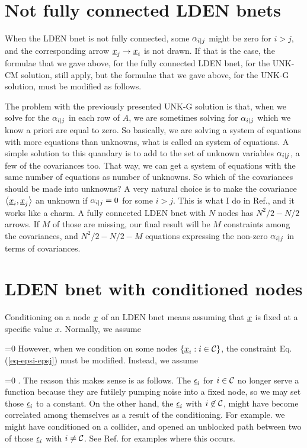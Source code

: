\section{Not fully connected LDEN bnets}

When the LDEN bnet is not
fully connected, some $\alpha_{i|j}$
might be zero for $i>j$, and the
corresponding arrow $\rvx_j\rarrow\rvx_i$
is not drawn. If that is the case,
the formulae that we gave above,
for the fully connected LDEN bnet,
for the UNK-CM solution, still apply,
but the formulae that we gave above, for the UNK-G solution,
must be modified as follows.

The problem with the previously
presented UNK-G solution is that,
when we solve for the $\alpha_{i|j}$
in each row of $A$,
we are sometimes solving for $\alpha_{i|j}$
which we know a priori are equal to zero.
So basically, we are solving a system of equations with more equations than unknowns,
what is called an  system
of equations. A simple solution
to this quandary is to add to the set
of unknown variables $\alpha_{i|j}$,
a few of the covariances too.
That way, we can get a system
of equations with the same number of
equations as number of unknowns.
So which of the covariances
should be made into unknowns?
A very natural choice
is to make the covariance $\av{\rvx_i, \rvx_j}$
an unknown if $\alpha_{i|j}=0$
for some $i>j$.
This is what I do in Ref.\cite{scumpy},
and it works like a charm.
A fully connected LDEN bnet with $N$ nodes
has $N^2/2-N/2$ arrows. If $M$ of those are 
missing, our final result 
will be $M$ constraints among the 
covariances, and $N^2/2-N/2 - M$
equations expressing the non-zero $\alpha_{i|j}$
in terms of covariances.


\section{LDEN bnet with conditioned nodes}

Conditioning on a node $\rvx$ 
of an LDEN bnet means assuming that $\rvx$  is
fixed at a specific value $x$.
Normally, we assume 

\beq
{}=0
\quad{}
\label{eq-epsi-epsj}
\eeq
However, when we condition on some nodes $\{\rvx_i: i\in \calc\}$, the constraint
Eq.(\ref{eq-epsi-epsj}) must be modified. Instead, we assume

 \beq{}=0
 \quad {}.
 \eeq
 The reason this makes sense is as follows.
 The $\rveps_i$ for $i\in {\cal C}$
 no longer serve a function because 
 they are futilely pumping noise into a fixed node,
 so we may set those $\rveps_i$ to a constant. 
 On the other hand,
 the  $\rveps_i$ with $i \not \in {\cal C}$, might have become correlated among themselves
 as a result  of the conditioning.
 For example.
  we might have conditioned on a collider, and opened an unblocked path between two of those $\rveps_i$ with $i\neq {\cal C}$. 
See Ref.\cite{scumpy}
for examples where this occurs.

